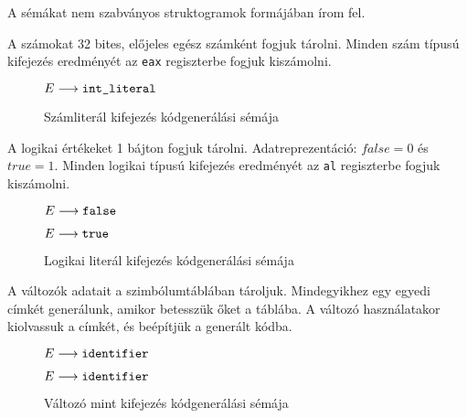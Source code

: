 A sémákat nem szabványos struktogramok formájában írom fel.

A számokat 32 bites, előjeles egész számként fogjuk tárolni. Minden szám típusú kifejezés eredményét az \texttt{eax} regiszterbe fogjuk kiszámolni.

\begin{figure}[h]
	\begin{stuki*}[5cm]{$E \longrightarrow \texttt{int\_literal}$}
	\end{stuki*}
	\caption{Számliterál kifejezés kódgenerálási sémája}
\end{figure}

A logikai értékeket 1 bájton fogjuk tárolni. Adatreprezentáció: $false = 0$ és $true = 1$. Minden logikai típusú kifejezés eredményét az \texttt{al} regiszterbe fogjuk kiszámolni.

\begin{figure}[h]
	\begin{minipage}{0.5\linewidth}
		\begin{stuki*}[5cm]{$E \longrightarrow \texttt{false}$}
		\end{stuki*}
	\end{minipage}
	\begin{minipage}{0.5\linewidth}
		\begin{stuki*}[5cm]{$E \longrightarrow \texttt{true}$}
		\end{stuki*}
	\end{minipage}
	\caption{Logikai literál kifejezés kódgenerálási sémája}
\end{figure}

A változók adatait a szimbólumtáblában tároljuk. Mindegyikhez egy egyedi címkét generálunk, amikor betesszük őket a táblába. A változó használatakor kiolvassuk a címkét, és beépítjük a generált kódba.

\begin{figure}[h]
	\begin{minipage}{0.5\linewidth}
		\begin{stuki*}[5cm]{$E \longrightarrow \texttt{identifier}$}
		\end{stuki*}
	\end{minipage}
	\begin{minipage}{0.5\linewidth}
		\begin{stuki*}[5cm]{$E \longrightarrow \texttt{identifier}$}
		\end{stuki*}
	\end{minipage}
	\caption{Változó mint kifejezés kódgenerálási sémája}
\end{figure}

